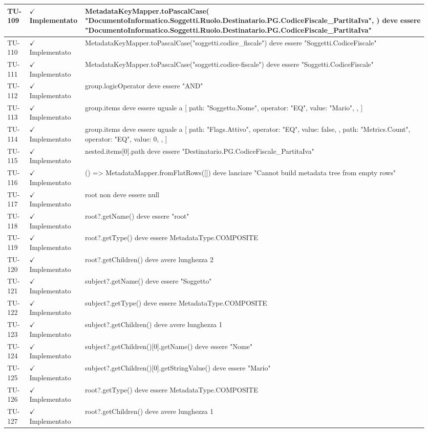 ﻿\documentclass[a4paper,12pt]{article}
\newcommand{\ok}{\textcolor{green!60!black}{$\checkmark$ Implementato}}
\begin{document}
\begin{longtable}{|p{2cm}|p{3.5cm}|p{9.5cm}|}
\hline
TU-109 & \ok & MetadataKeyMapper.toPascalCase( "DocumentoInformatico.Soggetti.Ruolo.Destinatario.PG.CodiceFiscale\_PartitaIva", ) deve essere "DocumentoInformatico.Soggetti.Ruolo.Destinatario.PG.CodiceFiscale\_PartitaIva" \\
\hline
TU-110 & \ok & MetadataKeyMapper.toPascalCase("soggetti.codice\_fiscale") deve essere "Soggetti.CodiceFiscale" \\
\hline
TU-111 & \ok & MetadataKeyMapper.toPascalCase("soggetti.codice-fiscale") deve essere "Soggetti.CodiceFiscale" \\
\hline
TU-112 & \ok & group.logicOperator deve essere "AND" \\
\hline
TU-113 & \ok & group.items deve essere uguale a [ { path: "Soggetto.Nome", operator: "EQ", value: "Mario", }, ] \\
\hline
TU-114 & \ok & group.items deve essere uguale a [ { path: "Flags.Attivo", operator: "EQ", value: false, }, { path: "Metrics.Count", operator: "EQ", value: 0, }, ] \\
\hline
TU-115 & \ok & nested.items[0].path deve essere "Destinatario.PG.CodiceFiscale\_PartitaIva" \\
\hline
TU-116 & \ok & () => MetadataMapper.fromFlatRows([]) deve lanciare "Cannot build metadata tree from empty rows" \\
\hline
TU-117 & \ok & root non deve essere null \\
\hline
TU-118 & \ok & root?.getName() deve essere "root" \\
\hline
TU-119 & \ok & root?.getType() deve essere MetadataType.COMPOSITE \\
\hline
TU-120 & \ok & root?.getChildren() deve avere lunghezza 2 \\
\hline
TU-121 & \ok & subject?.getName() deve essere "Soggetto" \\
\hline
TU-122 & \ok & subject?.getType() deve essere MetadataType.COMPOSITE \\
\hline
TU-123 & \ok & subject?.getChildren() deve avere lunghezza 1 \\
\hline
TU-124 & \ok & subject?.getChildren()[0].getName() deve essere "Nome" \\
\hline
TU-125 & \ok & subject?.getChildren()[0].getStringValue() deve essere "Mario" \\
\hline
TU-126 & \ok & root?.getType() deve essere MetadataType.COMPOSITE \\
\hline
TU-127 & \ok & root?.getChildren() deve avere lunghezza 1 \\
\hline

\end{longtable}
\end{document}
